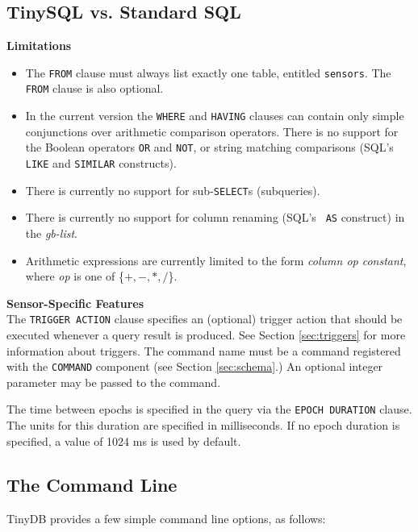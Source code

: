 \documentclass[11pt]{article}
\begin{document}
\subsection{TinySQL vs. Standard SQL}

\noindent
{\bf Limitations}
\begin{itemize}
\item The {\tt FROM} clause must always list exactly one table,
entitled {\tt sensors}.  The {\tt FROM} clause is also optional.
\item In the current version the {\tt WHERE} and {\tt HAVING} clauses
can contain only simple conjunctions over arithmetic comparison
operators.  There is no support for the Boolean operators {\tt OR} and
{\tt NOT}, or string matching comparisons
(SQL's {\tt LIKE} and {\tt SIMILAR}
constructs).
\item  There is currently no support for sub-{\tt SELECT}s (subqueries).
\item There is currently no support for column renaming (SQL's {\tt
  AS} construct) in the {\em gb-list}.
\item Arithmetic expressions are currently limited to the form {\em
  column op constant}, where {\em op} is one of \{$+, -, *, /$\}.
\end{itemize}

\noindent
{\bf Sensor-Specific Features}\\

The {\tt TRIGGER ACTION} clause specifies an (optional) trigger action that
should be executed whenever a query result is produced.  See Section \ref{sec:triggers}
for more information about triggers.  The command name must be a command registered with the
{\tt COMMAND}  component (see Section \ref{sec:schema}.)  An optional integer
parameter may be passed to the command.

The time between epochs is specified in the query via the {\tt EPOCH
DURATION} clause.  The units for this duration are specified in
milliseconds.  If no epoch duration is specified, a value of 1024 ms is used
by default.

\subsection{The Command Line}\label{sec:commandline}
TinyDB provides a few simple command line  options, as follows:
\end{document}
